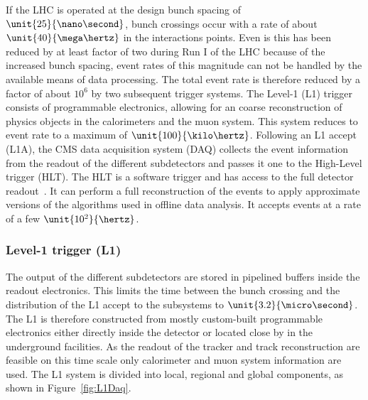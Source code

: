 If the LHC is operated at the design bunch spacing of $\unit{25}{\nano\second}$, bunch crossings occur with a rate of about $\unit{40}{\mega\hertz}$ in the interactions points. Even is this has been reduced by at least factor of two during Run I of the LHC because of the increased bunch spacing, event rates of this magnitude can not be handled by the available means of data processing. The total event rate is therefore reduced by a factor of about $10^6$ by two subsequent trigger systems. The Level-1 (L1) trigger consists of programmable electronics, allowing for an coarse reconstruction of physics objects in the calorimeters and the muon system. This system reduces to event rate to a maximum of $\unit{100}{\kilo\hertz}$. Following an L1 accept (L1A), the CMS data acquisition system (DAQ) collects the event information from the readout of the different subdetectors and passes it one to the High-Level trigger (HLT). The HLT is a software trigger and has access to the full detector readout~\cite{Adam:2005zf}. It can perform a full reconstruction of the events to apply approximate versions of the algorithms used in offline data analysis. It accepts events at a rate of a few $\unit{10^2}{\hertz}$.  

\subsubsection*{Level-1 trigger (L1)}
The output of the different subdetectors are stored in pipelined buffers inside the readout electronics. This limits the time between the bunch crossing and the distribution of the L1 accept to the subsystems to $\unit{3.2}{\micro\second}$. The L1 is therefore constructed from mostly custom-built programmable electronics either directly inside the detector or located close by in the underground facilities. As the readout of the tracker and track reconstruction are feasible on this time scale only calorimeter and muon system information are used. The L1 system is divided into local, regional and global components, as shown in Figure~\ref{fig:L1Daq}. 

